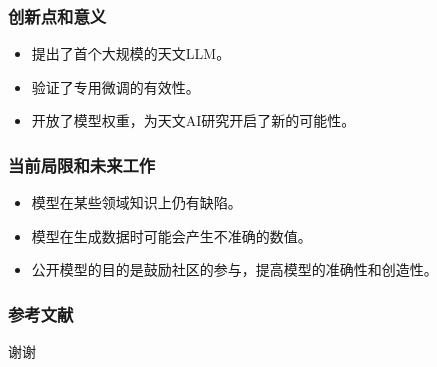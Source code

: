 \documentclass[10pt]{ctexbeamer}
\begin{document}
\begin{frame}[t]
  \frametitle{创新点和意义}
  \begin{itemize}
    \item 提出了首个大规模的天文LLM。
    \item 验证了专用微调的有效性。
    \item 开放了模型权重，为天文AI研究开启了新的可能性。
  \end{itemize}
\end{frame}

\begin{frame}[t]
  \frametitle{当前局限和未来工作}
  \begin{itemize}
    \item 模型在某些领域知识上仍有缺陷。
    \item 模型在生成数据时可能会产生不准确的数值。
    \item 公开模型的目的是鼓励社区的参与，提高模型的准确性和创造性。
  \end{itemize}
\end{frame}



\begin{frame}
  \frametitle{参考文献}
  \nocite{*}%
  \printbibliography%
\end{frame}

\begin{frame}[plain]
  \vfill
  \centerline{\Huge 谢谢}
  \vfill
\end{frame}
\end{document}
